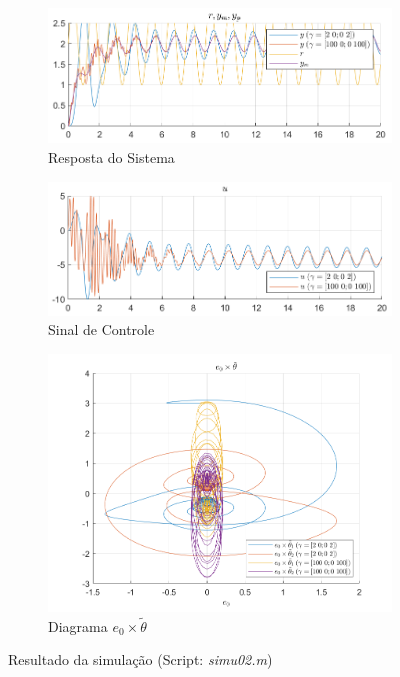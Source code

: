 \documentclass[10pt]{article}
\begin{document}
\begin{figure}[h!]
    \begin{subfigure}[b]{0.35\textwidth}
        \centering
        \includegraphics[width=\textwidth]{img/fig02c.png}
        \caption{Resposta do Sistema}
    \end{subfigure}
    \begin{subfigure}[b]{0.35\textwidth}
        \centering
        \includegraphics[width=\textwidth]{img/fig02e.png}
        \caption{Sinal de Controle}
    \end{subfigure}

    \begin{subfigure}[b]{0.35\textwidth}
        \centering
        \includegraphics[width=\textwidth]{img/fig02d.png}
        \caption{Diagrama $e_0 \times \tilde{\theta}$}
    \end{subfigure}

    \caption{Resultado da simulação (Script: \textit{simu02.m})}
    \label{fig:sim2}
\end{figure}
\end{document}
